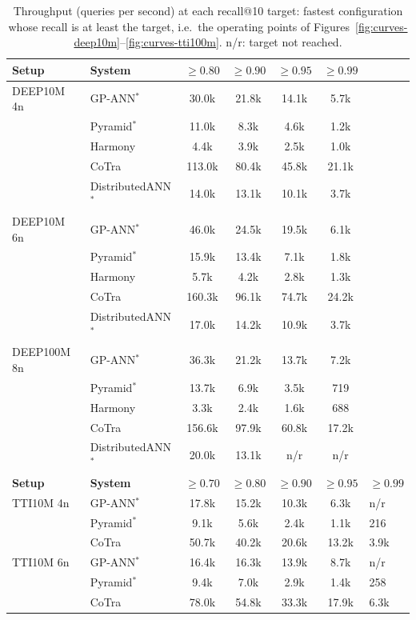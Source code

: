 \begin{table}[t]
\centering
\small
\caption{Throughput (queries per second) at each recall@10 target: fastest configuration whose recall is at least the target, i.e.\ the operating points of Figures~\ref{fig:curves-deep10m}--\ref{fig:curves-tti100m}. n/r: target not reached.}
\label{tab:qps-targets}
\begin{tabular}{llcccc}
\toprule
\textbf{Setup} & \textbf{System} & $\geq 0.80$ & $\geq 0.90$ & $\geq 0.95$ & $\geq 0.99$ \\
\midrule
DEEP10M 4n & GP-ANN$^*$ & 30.0k & 21.8k & 14.1k & 5.7k \\
 & Pyramid$^*$ & 11.0k & 8.3k & 4.6k & 1.2k \\
 & Harmony & 4.4k & 3.9k & 2.5k & 1.0k \\
 & CoTra & 113.0k & 80.4k & 45.8k & 21.1k \\
 & DistributedANN$^*$ & 14.0k & 13.1k & 10.1k & 3.7k \\
\addlinespace
DEEP10M 6n & GP-ANN$^*$ & 46.0k & 24.5k & 19.5k & 6.1k \\
 & Pyramid$^*$ & 15.9k & 13.4k & 7.1k & 1.8k \\
 & Harmony & 5.7k & 4.2k & 2.8k & 1.3k \\
 & CoTra & 160.3k & 96.1k & 74.7k & 24.2k \\
 & DistributedANN$^*$ & 17.0k & 14.2k & 10.9k & 3.7k \\
\addlinespace
DEEP100M 8n & GP-ANN$^*$ & 36.3k & 21.2k & 13.7k & 7.2k \\
 & Pyramid$^*$ & 13.7k & 6.9k & 3.5k & 719 \\
 & Harmony & 3.3k & 2.4k & 1.6k & 688 \\
 & CoTra & 156.6k & 97.9k & 60.8k & 17.2k \\
 & DistributedANN$^*$ & 20.0k & 13.1k & n/r & n/r \\
\midrule
\textbf{Setup} & \textbf{System} & $\geq 0.70$ & $\geq 0.80$ & $\geq 0.90$ & $\geq 0.95$ & $\geq 0.99$ \\
\midrule
TTI10M 4n & GP-ANN$^*$ & 17.8k & 15.2k & 10.3k & 6.3k & n/r \\
 & Pyramid$^*$ & 9.1k & 5.6k & 2.4k & 1.1k & 216 \\
 & CoTra & 50.7k & 40.2k & 20.6k & 13.2k & 3.9k \\
\addlinespace
TTI10M 6n & GP-ANN$^*$ & 16.4k & 16.3k & 13.9k & 8.7k & n/r \\
 & Pyramid$^*$ & 9.4k & 7.0k & 2.9k & 1.4k & 258 \\
 & CoTra & 78.0k & 54.8k & 33.3k & 17.9k & 6.3k \\

\end{tabular}
\end{table}
